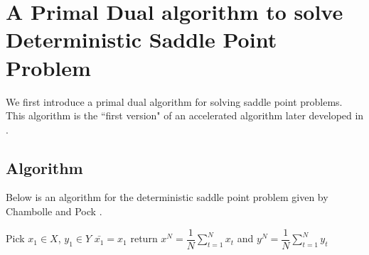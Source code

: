 \documentclass[12pt,reqno]{amsart}
\numberwithin{equation}{section}
\begin{document}
%

\section{A Primal Dual algorithm to solve Deterministic Saddle Point Problem }

We first introduce a primal dual algorithm for solving saddle point problems. This algorithm is the ``first version" of an accelerated algorithm later developed in \cite{ChenLanOuyang}.

\subsection{Algorithm}

Below is an algorithm for the deterministic saddle point problem given by Chambolle and Pock \cite{ChambollePock}.

\smallskip
\begin{algorithm}[H]
\SetAlgoLined
{}
Pick $x_{1} \in X$, $y_{1} \in Y$\;
$\bar{x_1} = x_1$ \;
return $x^{N} = \dfrac{1}{N}\sum_{t=1}^{N} x_{t}$ and $y^{N} = \dfrac{1}{N}\sum_{t=1}^{N} y_{t}$\;
\end{algorithm}
\smallskip
\end{document}
